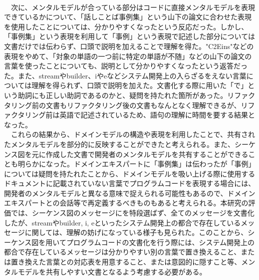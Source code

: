 \documentclass[11pt, a4paper]{jreport}
\begin{document}
\\　次に、メンタルモデルが合っている部分はコードに直接メンタルモデルを表現できているかについて、「話しことば事例集」という山下の論文に合わせた表現を使用したことについては、分かりやすくなったという反応だった。しかし、「事例集」という表現を利用して「事例」という表現で記述した部分については文書だけでは伝わらず、口頭で説明を加えることで理解を得た。"C2Eins"などの表現をやめて、「対象の単語の一つ前に特定の単語が不随」などの山下の論文の言葉を使ったことについても、説明として分かりやすくなったという返答だった。また、streamやbuilder、iやeなどシステム開発上の入らざるをえない言葉については理解を得られず、口頭で説明を加えた。文書化する際に用いた「で」という助詞にも正しい助詞であるのかと、疑問を持たれた箇所があった。リファクタリング前の文書もリファクタリング後の文書もなんとなく理解できるが、リファクタリング前は英語で記述されているため、語句の理解に時間を要する結果となった。
\\　これらの結果から、ドメインモデルの構造や表現を利用したことで、共有されたメンタルモデルを部分的に反映することができたと考えられる。また、シーケンス図を元に作成した文書で開発者のメンタルモデルを共有することができることも明らかになった。ドメインエキスパートに「事例集」は伝わったが「事例」については疑問を持たれたことから、ドメインモデルを吸い上げる際に使用するドキュメントに記載されていない言葉でプログラムコードを表現する場合には、開発者のメンタルモデルと異なる意味で捉えられる可能性もあるので、ドメインエキスパートとの会話等で再定義するべきものもあると考えられる。本研究の評価では、シーケンス図のメッセージにを特段選ばず、全てのメッセージを文書化したが、streamやbuilder, i, eといったシステム開発上の都合で存在しているメッセージに関しては、理解の妨げになっている様子も見られた。このことから、シーケンス図を用いてプログラムコードの文書化を行う際には、システム開発上の都合で存在しているメッセージは分かりやすい別の言葉で置き換えること、または置き換えた言葉との対応表を用意すること、または意図的に隠すこと等、メンタルモデルを共有しやすい文書となるよう考慮する必要がある。
\end{document}
